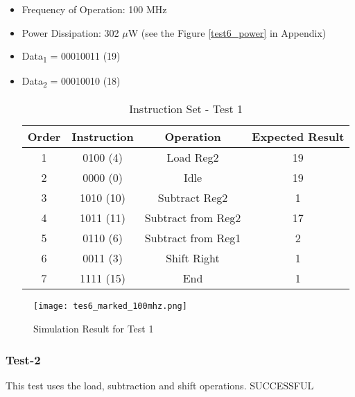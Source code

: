 \documentclass[12pt]{article}
\begin{document}
\begin{itemize}
\item Frequency of Operation: 100 MHz
\item Power Dissipation: 302 $\mu$W (see the Figure \ref{test6_power} in Appendix)
\item Data\textsubscript{1} = 00010011 (19) 
\item Data\textsubscript{2} = 00010010 (18) 
\begin{table}[h]
\centering
\begin{tabular}{|c|c|c|c|}
\hline 
Order & Instruction & Operation & Expected Result \\ 
\hline 
1 & 0100 (4) & Load Reg2 & 19 \\ 
\hline 
2 & 0000 (0) & Idle & 19 \\ 
\hline 
3 & 1010 (10) & Subtract Reg2 & 1 \\ 
\hline 
4 & 1011 (11) & Subtract from Reg2 & 17 \\ 
\hline 
5 & 0110 (6) & Subtract from Reg1 & 2 \\ 
\hline 
6 & 0011 (3)& Shift Right & 1 \\ 
\hline 
7 & 1111 (15) & End & 1 \\ 
\hline 
\end{tabular} 
\caption{Instruction Set - Test 1}
\end{table}
\end{itemize}


\begin{figure}[H]
\centering
\texttt{[image: tes6\_marked\_100mhz.png]}
\caption{Simulation Result for Test 1}
\label{test6}
\end{figure}



\subsubsection*{Test-2} %
This test uses the load, subtraction and shift operations. \color{Green} SUCCESSFUL \color{Black}
\end{document}
